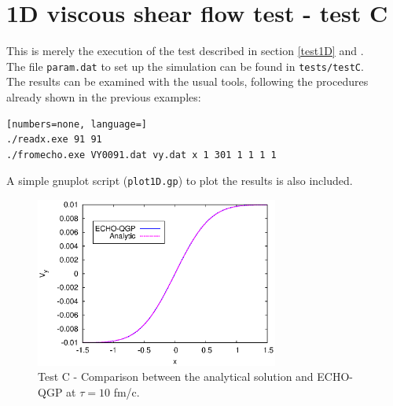 \section{1D viscous shear flow test - test C}\label{sec:gub}
This is merely the execution of the test described in section \ref{test1D} and \cite{DelZanna:2013eua}.\\
The file {\tt param.dat} to set up the simulation can be found in {\tt tests/testC}.\\
The results can be examined with the usual tools, following the procedures already shown in the previous examples:\\
\begin{lstlisting}[numbers=none, language=]
./readx.exe 91 91
./fromecho.exe VY0091.dat vy.dat x 1 301 1 1 1 1
\end{lstlisting}
A simple gnuplot script ({\tt plot1D.gp}) to plot the results is also included.\\
\begin{figure}[!h]
 \begin{center}
  \includegraphics[width=8cm]{images/test1D.eps}
   \caption{Test C - Comparison between the analytical solution and ECHO-QGP at $\tau=10$ fm/c.}
    \label{testC}
 \end{center}
\end{figure}

